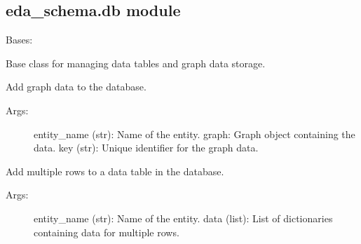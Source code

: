 \documentclass[letterpaper,10pt,english]{sphinxmanual}
\begin{document}
\subsection{eda\_schema.db module}
\label{\detokenize{eda_schema:module-eda_schema.db}}\label{\detokenize{eda_schema:eda-schema-db-module}}

\begin{fulllineitems}
\label{\detokenize{eda_schema:eda_schema.db.BaseDB}}
\pysigstartsignatures
{}
\pysigstopsignatures
\sphinxAtStartPar
Bases: 

\sphinxAtStartPar
Base class for managing data tables and graph data storage.

\begin{fulllineitems}
\label{\detokenize{eda_schema:eda_schema.db.BaseDB.add_graph_data}}
\pysigstartsignatures
{}
\pysigstopsignatures
\sphinxAtStartPar
Add graph data to the database.
\begin{description}
\item[{Args:}] \leavevmode
\sphinxAtStartPar
entity\_name (str): Name of the entity.
graph: Graph object containing the data.
key (str): Unique identifier for the graph data.

\end{description}

\end{fulllineitems}


\begin{fulllineitems}
\label{\detokenize{eda_schema:eda_schema.db.BaseDB.add_table_data}}
\pysigstartsignatures
{}
\pysigstopsignatures
\sphinxAtStartPar
Add multiple rows to a data table in the database.
\begin{description}
\item[{Args:}] \leavevmode
\sphinxAtStartPar
entity\_name (str): Name of the entity.
data (list): List of dictionaries containing data for multiple rows.


\end{description}
\end{fulllineitems}
\end{fulllineitems}
\end{document}
